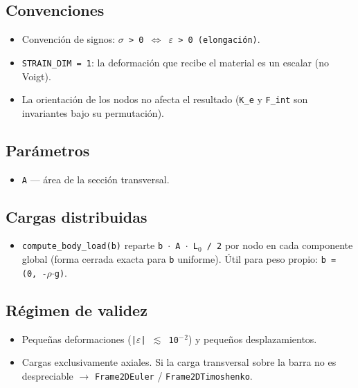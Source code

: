 \documentclass[11pt,letterpaper,oneside]{report}
\begin{document}
\subsection{Convenciones}
\begin{itemize}
  \item Convención de signos: \texttt{\ensuremath{\sigma} > 0 \ensuremath{\Leftrightarrow} \ensuremath{\varepsilon} > 0 (elongación)}.
  \item \texttt{STRAIN\_DIM = 1}: la deformación que recibe el material es un escalar (no Voigt).
  \item La orientación de los nodos no afecta el resultado (\texttt{K\_e} y \texttt{F\_int} son invariantes bajo su permutación).
\end{itemize}

\subsection{Parámetros}
\begin{itemize}
  \item \texttt{A} --- área de la sección transversal.
\end{itemize}

\subsection{Cargas distribuidas}
\begin{itemize}
  \item \texttt{compute\_body\_load(b)} reparte \texttt{b \ensuremath{\cdot} A \ensuremath{\cdot} L\ensuremath{_{0}} / 2} por nodo en cada componente global (forma cerrada exacta para \texttt{b} uniforme). Útil para peso propio: \texttt{b = (0, -\ensuremath{\rho}\ensuremath{\cdot}g)}.
\end{itemize}

\subsection{Régimen de validez}
\begin{itemize}
  \item Pequeñas deformaciones (\texttt{|\ensuremath{\varepsilon}| \ensuremath{\lesssim} 10\ensuremath{^{-}}\ensuremath{^{2}}}) y pequeños desplazamientos.
  \item Cargas exclusivamente axiales. Si la carga transversal sobre la barra no es despreciable \ensuremath{\to} \texttt{Frame2DEuler} / \texttt{Frame2DTimoshenko}.
\end{itemize}
\end{document}
